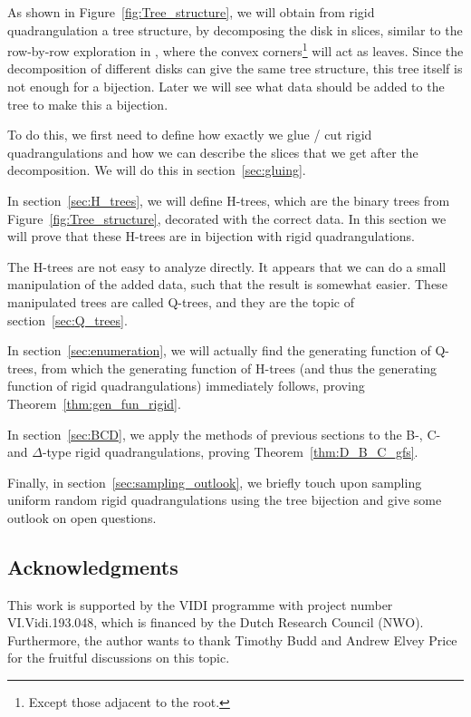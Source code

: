 \documentclass[11pt]{article}
\theoremstyle{plain}
\theoremstyle{definition}
\begin{document}
As shown in Figure~\ref{fig:Tree_structure}, we will obtain from rigid quadrangulation a tree structure, by decomposing the disk in slices, similar to the row-by-row exploration in \cite{Budd_rectilinear_2025}, where the convex corners\footnote{Except those adjacent to the root.} will act as leaves.
Since the decomposition of different disks can give the same tree structure, this tree itself is not enough for a bijection. 
Later we will see what data should be added to the tree to make this a bijection. 

To do this, we first need to define how exactly we glue / cut rigid quadrangulations and how we can describe the slices that we get after the decomposition.
We will do this in section~\ref{sec:gluing}.

In section~\ref{sec:H_trees}, we will define H-trees, which are the binary trees from Figure~\ref{fig:Tree_structure}, decorated with the correct data. 
In this section we will prove that these H-trees are in bijection with rigid quadrangulations.

The H-trees are not easy to analyze directly. 
It appears that we can do a small manipulation of the added data, such that the result is somewhat easier.
These manipulated trees are called Q-trees, and they are the topic of section~\ref{sec:Q_trees}.

In section~\ref{sec:enumeration}, we will actually find the generating function of Q-trees, from which the generating function of H-trees (and thus the generating function of rigid quadrangulations) immediately follows, proving Theorem~\ref{thm:gen_fun_rigid}.

In section~\ref{sec:BCD}, we apply the methods of previous sections to the B-, C- and $\Delta$-type rigid quadrangulations, proving Theorem~\ref{thm:D_B_C_gfs}. 

Finally, in section~\ref{sec:sampling_outlook}, we briefly touch upon sampling uniform random rigid quadrangulations using the tree bijection and give some outlook on open questions.

\FloatBarrier
\subsection*{Acknowledgments}
This work is supported by the VIDI programme with project number VI.Vidi.193.048, which is financed by the Dutch Research Council (NWO).
Furthermore, the author wants to thank Timothy Budd and Andrew Elvey Price for the fruitful discussions on this topic.
\end{document}
